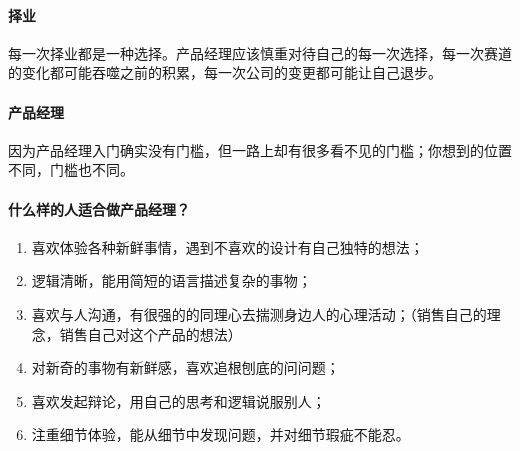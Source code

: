 \documentclass[letterpaper,10pt,english]{sphinxmanual}
\begin{document}
\paragraph{择业}
\label{\detokenize{chapter_introduction/career_path:id2}}
每一次择业都是一种选择。产品经理应该慎重对待自己的每一次选择，每一次赛道的变化都可能吞噬之前的积累，每一次公司的变更都可能让自己退步。


\paragraph{产品经理}
\label{\detokenize{chapter_introduction/career_path:id3}}

因为产品经理入门确实没有门槛，但一路上却有很多看不见的门槛；你想到的位置不同，门槛也不同。%
\begin{footnote}[348]\sphinxAtStartFootnote
{}
%
\end{footnote}


\paragraph{什么样的人适合做产品经理？}
\label{\detokenize{chapter_introduction/career_path:id4}}\begin{enumerate}
%
\item {} 
喜欢体验各种新鲜事情，遇到不喜欢的设计有自己独特的想法；

\item {} 
逻辑清晰，能用简短的语言描述复杂的事物；

\item {} 
喜欢与人沟通，有很强的的同理心去揣测身边人的心理活动；（销售自己的理念，销售自己对这个产品的想法）

\item {} 
对新奇的事物有新鲜感，喜欢追根刨底的问问题；

\item {} 
喜欢发起辩论，用自己的思考和逻辑说服别人；

\item {} 
注重细节体验，能从细节中发现问题，并对细节瑕疵不能忍。

\end{enumerate}
\end{document}
